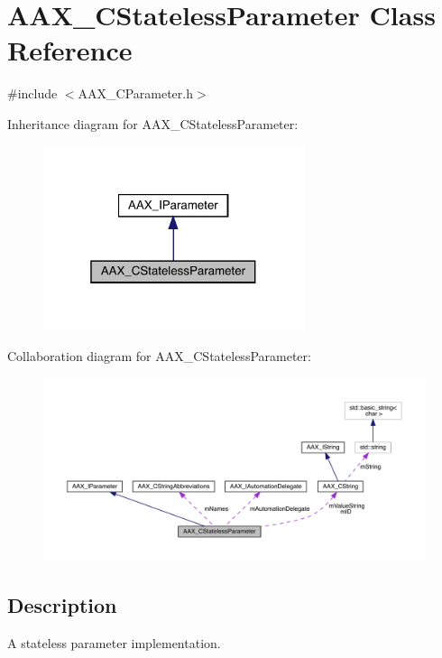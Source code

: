 \hypertarget{a01541}{}\section{A\+A\+X\+\_\+\+C\+Stateless\+Parameter Class Reference}
\label{a01541}


{\ttfamily \#include $<$A\+A\+X\+\_\+\+C\+Parameter.\+h$>$}



Inheritance diagram for A\+A\+X\+\_\+\+C\+Stateless\+Parameter\+:
\nopagebreak
\begin{figure}[H]
\begin{center}
\leavevmode
\includegraphics[width=217pt]{a01540}
\end{center}
\end{figure}


Collaboration diagram for A\+A\+X\+\_\+\+C\+Stateless\+Parameter\+:
\nopagebreak
\begin{figure}[H]
\begin{center}
\leavevmode
\includegraphics[width=350pt]{a01539}
\end{center}
\end{figure}


\subsection{Description}
A stateless parameter implementation. 

